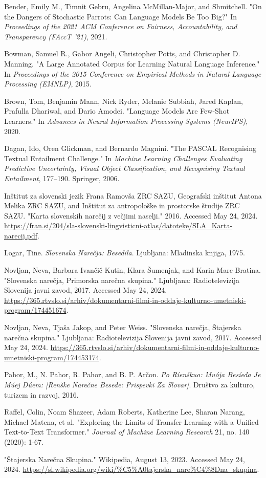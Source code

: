\documentclass[fleqn,moreauthors,10pt]{ds_report}
\begin{document}
Bender, Emily M., Timnit Gebru, Angelina McMillan-Major, and Shmitchell. "On the Dangers of Stochastic Parrots: Can Language Models Be Too Big?" In \textit{Proceedings of the 2021 ACM Conference on Fairness, Accountability, and Transparency (FAccT '21)}, 2021.

Bowman, Samuel R., Gabor Angeli, Christopher Potts, and Christopher D. Manning. "A Large Annotated Corpus for Learning Natural Language Inference." In \textit{Proceedings of the 2015 Conference on Empirical Methods in Natural Language Processing (EMNLP)}, 2015.

Brown, Tom, Benjamin Mann, Nick Ryder, Melanie Subbiah, Jared Kaplan, Prafulla Dhariwal, and Dario Amodei. "Language Models Are Few-Shot Learners." In \textit{Advances in Neural Information Processing Systems (NeurIPS)}, 2020.

Dagan, Ido, Oren Glickman, and Bernardo Magnini. "The PASCAL Recognising Textual Entailment Challenge." In \textit{Machine Learning Challenges Evaluating Predictive Uncertainty, Visual Object Classification, and Recognising Textual Entailment}, 177–190. Springer, 2006.

Inštitut za slovenski jezik Frana Ramovša ZRC SAZU, Geografski inštitut Antona Melika ZRC SAZU, and Inštitut za antropološke in prostorske študije ZRC SAZU. "Karta slovenskih narečij z večjimi naselji." 2016. Accessed May 24, 2024. \url{https://fran.si/204/sla-slovenski-lingvisticni-atlas/datoteke/SLA_Karta-narecij.pdf}.

Logar, Tine. \textit{Slovenska Narečja: Besedila}. Ljubljana: Mladinska knjiga, 1975.

Novljan, Neva, Barbara Ivančič Kutin, Klara Šumenjak, and Karin Marc Bratina. "Slovenska narečja, Primorska narečna skupina." Ljubljana: Radiotelevizija Slovenija javni zavod, 2017. Accessed May 24, 2024. \url{https://365.rtvslo.si/arhiv/dokumentarni-filmi-in-oddaje-kulturno-umetniski-program/174451674}.

Novljan, Neva, Tjaša Jakop, and Peter Weiss. "Slovenska narečja, Štajerska narečna skupina." Ljubljana: Radiotelevizija Slovenija javni zavod, 2017. Accessed May 24, 2024. \url{https://365.rtvslo.si/arhiv/dokumentarni-filmi-in-oddaje-kulturno-umetniski-program/174453174}.

Pahor, M., N. Pahor, R. Pahor, and B. P. Arčon. \textit{Po Ríenškuo: Muója Besíeda Je Múej Dúem: [Renške Narečne Besede: Prispevki Za Slovar]}. Društvo za kulturo, turizem in razvoj, 2016.

Raffel, Colin, Noam Shazeer, Adam Roberts, Katherine Lee, Sharan Narang, Michael Matena, et al. "Exploring the Limits of Transfer Learning with a Unified Text-to-Text Transformer." \textit{Journal of Machine Learning Research} 21, no. 140 (2020): 1-67.

"Štajerska Narečna Skupina." Wikipedia, August 13, 2023. Accessed May 24, 2024. \url{https://sl.wikipedia.org/wiki/%C5%A0tajerska_nare%C4%8Dna_skupina}.

 
\end{document}
